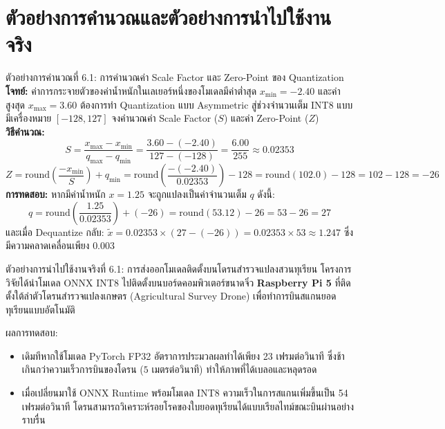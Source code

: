 \section{ตัวอย่างการคำนวณและตัวอย่างการนำไปใช้งานจริง}

\begin{examplebox}{ตัวอย่างการคำนวณที่ 6.1: การคำนวณค่า Scale Factor และ Zero-Point ของ Quantization}
\textbf{โจทย์:} ค่าการกระจายตัวของค่าน้ำหนักในเลเยอร์หนึ่งของโมเดลมีค่าต่ำสุด $x_{\text{min}} = -2.40$ และค่าสูงสุด $x_{\text{max}} = 3.60$ ต้องการทำ Quantization แบบ Asymmetric สู่ช่วงจำนวนเต็ม INT8 แบบมีเครื่องหมาย $[-128, 127]$ จงคำนวณค่า Scale Factor ($S$) และค่า Zero-Point ($Z$)\\[4pt]
\textbf{วิธีคำนวณ:}
\[
S = \frac{x_{\text{max}} - x_{\text{min}}}{q_{\text{max}} - q_{\text{min}}} = \frac{3.60 - (-2.40)}{127 - (-128)} = \frac{6.00}{255} \approx 0.02353
\]
\[
Z = \text{round}\left( \frac{-x_{\text{min}}}{S} \right) + q_{\text{min}} = \text{round}\left( \frac{-(-2.40)}{0.02353} \right) - 128 = \text{round}(102.0) - 128 = 102 - 128 = -26
\]
\textbf{การทดสอบ:} หากมีค่าน้ำหนัก $x = 1.25$ จะถูกแปลงเป็นค่าจำนวนเต็ม $q$ ดังนี้:
\[
q = \text{round}\left( \frac{1.25}{0.02353} \right) + (-26) = \text{round}(53.12) - 26 = 53 - 26 = 27
\]
และเมื่อ Dequantize กลับ: $\tilde{x} = 0.02353 \times (27 - (-26)) = 0.02353 \times 53 \approx 1.247$ ซึ่งมีความคลาดเคลื่อนเพียง $0.003$
\end{examplebox}

\begin{casestudybox}{ตัวอย่างการนำไปใช้งานจริงที่ 6.1: การส่งออกโมเดลติดตั้งบนโดรนสำรวจแปลงสวนทุเรียน}
โครงการวิจัยได้นำโมเดล ONNX INT8 ไปติดตั้งบนบอร์ดคอมพิวเตอร์ขนาดจิ๋ว \textbf{Raspberry Pi 5} ที่ติดตั้งใต้ลำตัวโดรนสำรวจแปลงเกษตร (Agricultural Survey Drone) เพื่อทำการบินสแกนยอดทุเรียนแบบอัตโนมัติ

ผลการทดสอบ:
\begin{itemize}[leftmargin=1.4em, itemsep=2pt]
    \item เดิมทีหากใช้โมเดล PyTorch FP32 อัตราการประมวลผลทำได้เพียง 23 เฟรมต่อวินาที ซึ่งช้าเกินกว่าความเร็วการบินของโดรน ($5$ เมตรต่อวินาที) ทำให้ภาพที่ได้เบลอและหลุดรอด
    \item เมื่อเปลี่ยนมาใช้ ONNX Runtime พร้อมโมเดล INT8 ความเร็วในการสแกนเพิ่มขึ้นเป็น 54 เฟรมต่อวินาที โดรนสามารถวิเคราะห์รอยโรคของใบยอดทุเรียนได้แบบเรียลไทม์ขณะบินผ่านอย่างราบรื่น
\end{itemize}
\end{casestudybox}

